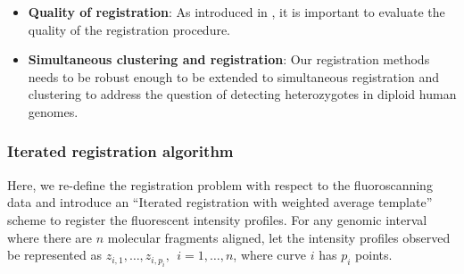 \begin{itemize}
\item {\bf{Quality of registration}}: As introduced in \cite{Sangalli_etal_2009_JASA}, it is important to evaluate the quality of the registration procedure. 

\item {\bf{Simultaneous clustering and registration}}: Our registration methods needs to be robust enough to be extended to simultaneous registration and clustering to address the question of detecting heterozygotes in diploid human genomes.  
\end{itemize}

\subsubsection*{Iterated registration algorithm}
Here, we re-define the registration problem with respect to the fluoroscanning data and introduce an ``Iterated registration with weighted average template'' scheme to register the fluorescent intensity profiles.
For any genomic interval where there are $n$ molecular fragments aligned, let the intensity profiles observed be represented as $z_{i,1}, \dots, z_{i, p_i},\ \ i = 1,\dots, n$, where curve $i$ has $p_i$ points. 
